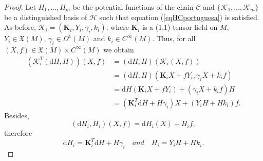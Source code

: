 \documentclass[10pt]{amsart}
\numberwithin{equation}{section}
\newcommand{\rd}{\mathrm{d}}
\newcommand{\bs}{\boldsymbol}
\theoremstyle{definition}
\begin{document}
\begin{proof}
Let $H_{1},\ldots,H_{m}$ be the potential functions of the chain $\mathscr{C}$ and $\lbrace \bs{\mathcal{K}}_{1},\ldots,\bs{\mathcal{K}}_{m}\rbrace$ be a distinguished basis of $\mathscr{H}$ such that equation (\ref{eqHCportuguesa}) is satisfied. 
As before, $\bs{\mathcal{K}}_{i}=(\bs{K}_{i},Y_{i},\gamma_{i},k_{i})$, where $\bs{K}_{i}$ is a (1,1)-tensor field on $M$, $Y_{i}\in \mathfrak{X}(M)$, $\gamma_{i}\in \Omega^{1}(M)$ and $k_{i}\in C^{\infty}(M)$. Thus, for all $(X,f)\in\mathfrak{X}(M)\times C^{\infty}(M)$ we obtain
\begin{equation}
\begin{split}
\left( \bs{\mathcal{K}}_{i}^{T}(\rd H,H)\right)(X,f)&=(\rd H,H)\left( \bs{\mathcal{K}}_{i}(X,f)\right)\\
&=(\rd H,H)(\bs{K}_{i}X+fY_{i},\gamma_{i}X+k_{i}f)\\
&=\rd H(\bs{K}_{i}X+fY_{i})+(\gamma_{i}X+k_{i}f)H\\
&=(\bs{K}_{i}^{T}\rd H+H\gamma_{i})X+(Y_{i}H+Hk_{i})f.
\end{split}
\end{equation}
Besides,
\begin{equation}
(\rd H_{i},H_{i})(X,f)=\rd H_{i}(X)+H_{i}f,
\end{equation}
therefore
\begin{equation}
\label{dHi,Hi}
\rd H_{i}=\bs{K}_{i}^{T}\rd H+H\gamma_{i}\quad\textit{and}\quad H_{i}=Y_{i}H+Hk_{i}.
\end{equation}


\end{proof}
\end{document}

